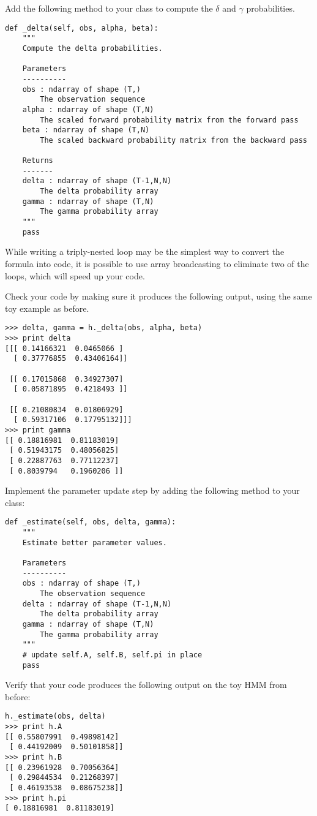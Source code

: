 Add the following method to your class to compute the $\delta$ and $\gamma$ probabilities.
\begin{lstlisting}
def _delta(self, obs, alpha, beta):
    """
    Compute the delta probabilities.

    Parameters
    ----------
    obs : ndarray of shape (T,)
        The observation sequence
    alpha : ndarray of shape (T,N)
        The scaled forward probability matrix from the forward pass
    beta : ndarray of shape (T,N)
        The scaled backward probability matrix from the backward pass

    Returns
    -------
    delta : ndarray of shape (T-1,N,N)
        The delta probability array
    gamma : ndarray of shape (T,N)
        The gamma probability array
    """
    pass
\end{lstlisting}
While writing a triply-nested loop may be the simplest way to convert the formula into code,
it is possible to use array broadcasting to eliminate two of the loops, which will speed up your code.

Check your code by making sure it produces the following output, using the same toy example as before.
\begin{lstlisting}
>>> delta, gamma = h._delta(obs, alpha, beta)
>>> print delta
[[[ 0.14166321  0.0465066 ]
  [ 0.37776855  0.43406164]]

 [[ 0.17015868  0.34927307]
  [ 0.05871895  0.4218493 ]]

 [[ 0.21080834  0.01806929]
  [ 0.59317106  0.17795132]]]
>>> print gamma
[[ 0.18816981  0.81183019]
 [ 0.51943175  0.48056825]
 [ 0.22887763  0.77112237]
 [ 0.8039794   0.1960206 ]]
\end{lstlisting}

Implement the parameter update step by adding the following method to your class:
\begin{lstlisting}
def _estimate(self, obs, delta, gamma):
    """
    Estimate better parameter values.

    Parameters
    ----------
    obs : ndarray of shape (T,)
        The observation sequence
    delta : ndarray of shape (T-1,N,N)
        The delta probability array
    gamma : ndarray of shape (T,N)
        The gamma probability array
    """
    # update self.A, self.B, self.pi in place
    pass
\end{lstlisting}
Verify that your code produces the following output on the toy HMM from before:
\begin{lstlisting}
h._estimate(obs, delta)
>>> print h.A
[[ 0.55807991  0.49898142]
 [ 0.44192009  0.50101858]]
>>> print h.B
[[ 0.23961928  0.70056364]
 [ 0.29844534  0.21268397]
 [ 0.46193538  0.08675238]]
>>> print h.pi
[ 0.18816981  0.81183019]
\end{lstlisting}

